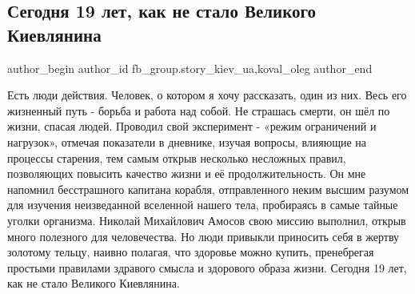  
 
 
 
 
 
\subsection{Сегодня 19 лет, как не стало Великого Киевлянина}
\label{sec:12_12_2021.fb.fb_group.story_kiev_ua.1.amosov}
 
\ifcmt
 author_begin
   author_id fb_group.story_kiev_ua,koval_oleg
 author_end
\fi


\begingroup
\Large
Есть люди действия. Человек, о котором я хочу рассказать, один из них. Весь его
жизненный путь - борьба и работа над собой. Не страшась смерти, он шёл по
жизни, спасая людей. Проводил свой эксперимент - «режим ограничений и
нагрузок», отмечая показатели в дневнике, изучая вопросы, влияющие на процессы
старения, тем самым открыв несколько несложных правил, позволяющих повысить
качество жизни и её продолжительность. Он мне напомнил бесстрашного капитана
корабля, отправленного неким высшим разумом для изучения неизведанной вселенной
нашего тела, пробираясь в самые тайные уголки организма. Николай Михайлович
Амосов свою миссию выполнил, открыв много полезного для человечества. Но люди
привыкли приносить себя в жертву золотому тельцу, наивно полагая, что здоровье
можно купить, пренебрегая простыми правилами здравого смысла и здорового образа
жизни. Сегодня 19 лет, как не стало Великого Киевлянина.
\endgroup

